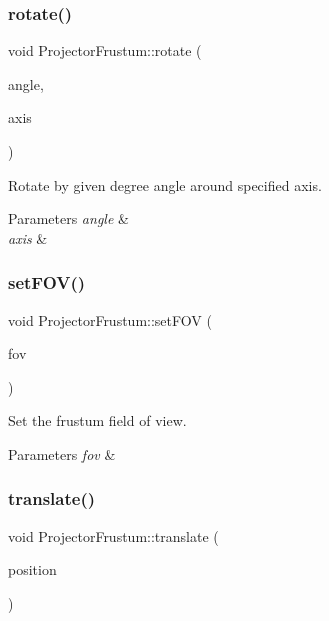 \subsubsection{\texorpdfstring{rotate()}{rotate()}}
{\footnotesize\ttfamily void Projector\+Frustum\+::rotate (\begin{DoxyParamCaption}\item[{float}]{angle,  }\item[{Q\+Vector3D const \&}]{axis }\end{DoxyParamCaption})}



Rotate by given degree angle around specified axis. 


\begin{DoxyParams}{Parameters}
{\em angle} & \\
\hline
{\em axis} & \\
\hline
\end{DoxyParams}
\mbox{\label{class_projector_frustum_addd0f88dab59f47a2e66d8e08d438425}} 
\subsubsection{\texorpdfstring{set\+F\+O\+V()}{setFOV()}}
{\footnotesize\ttfamily void Projector\+Frustum\+::set\+F\+OV (\begin{DoxyParamCaption}\item[{float}]{fov }\end{DoxyParamCaption})}



Set the frustum field of view. 


\begin{DoxyParams}{Parameters}
{\em fov} & \\
\hline
\end{DoxyParams}
\mbox{\label{class_projector_frustum_a1c5c97e807392f1e828c050ef17bcc92}} 
\subsubsection{\texorpdfstring{translate()}{translate()}}
{\footnotesize\ttfamily void Projector\+Frustum\+::translate (\begin{DoxyParamCaption}\item[{Q\+Vector3D const \&}]{position }\end{DoxyParamCaption})}



